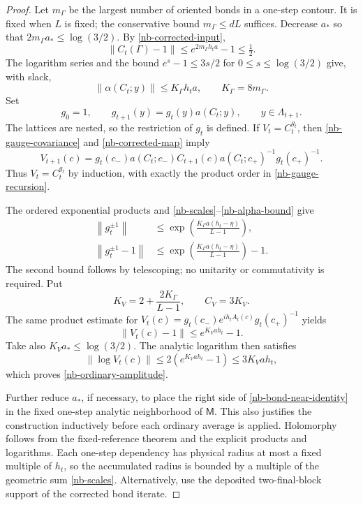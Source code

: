 \documentclass[11pt]{article}
\theoremstyle{remark}
\newcommand{\norm}[1]{\left\|#1\right\|}
\begin{document}
\begin{proof}
Let $m_\Gamma$ be the largest number of oriented bonds in a
one-step contour. It is fixed when $L$ is fixed; the conservative
bound $m_\Gamma\le dL$ suffices. Decrease $a_*$ so that
$2m_\Gamma a_*\le\log(3/2)$. By
\eqref{nb-corrected-input},
\[
 \norm{C_t(\Gamma)-1}
      \le e^{2m_\Gamma h_ta}-1\le\tfrac12.
\]
The logarithm series and the bound
$e^s-1\le3s/2$ for $0\le s\le\log(3/2)$ give, with slack,
\begin{equation}\label{nb-alpha-bound}
 \norm{\alpha(C_t;y)}\le K_\Gamma h_ta,
                   \qquad K_\Gamma=8m_\Gamma.
\end{equation}
Set
\begin{equation}\label{nb-gauge-recursion}
 g_0=1,\qquad
 g_{t+1}(y)=g_t(y)a(C_t;y),\qquad y\in\Lambda_{t+1}.
\end{equation}
The lattices are nested, so the restriction of $g_t$ is defined.
If $V_t=C_t^{g_t}$, then \eqref{nb-gauge-covariance} and
\eqref{nb-corrected-map} imply
\[
 V_{t+1}(c)=g_t(c_-)a(C_t;c_-)C_{t+1}(c)
                       a(C_t;c_+)^{-1}g_t(c_+)^{-1}.
\]
Thus $V_t=C_t^{g_t}$ by induction, with exactly the product
order in \eqref{nb-gauge-recursion}.

The ordered exponential products and
\eqref{nb-scales}--\eqref{nb-alpha-bound} give
\begin{align}
 \norm{g_t^{\pm1}}
       &\le\exp\left(\frac{K_\Gamma a(h_t-\eta)}{L-1}\right),
       \label{nb-gauge-size}\\
 \norm{g_t^{\pm1}-1}
       &\le\exp\left(\frac{K_\Gamma a(h_t-\eta)}{L-1}\right)-1.
       \label{nb-gauge-difference}
\end{align}
The second bound follows by telescoping; no unitarity or
commutativity is required. Put
\begin{equation}\label{nb-explicit-constants}
 K_V=2+\frac{2K_\Gamma}{L-1},\qquad C_V=3K_V.
\end{equation}
The same product estimate for
$V_t(c)=g_t(c_-)e^{ih_tA_t(c)}g_t(c_+)^{-1}$ yields
\begin{equation}\label{nb-bond-near-identity}
 \norm{V_t(c)-1}\le e^{K_Vah_t}-1.
\end{equation}
Take also $K_Va_*\le\log(3/2)$. The analytic logarithm then
satisfies
\[
 \norm{\log V_t(c)}
    \le2(e^{K_Vah_t}-1)\le3K_Vah_t,
\]
which proves \eqref{nb-ordinary-amplitude}.

Further reduce $a_*$, if necessary, to place the right side of
\eqref{nb-bond-near-identity} in the fixed one-step analytic
neighborhood of $\mathsf M$. This also justifies the construction
inductively before each ordinary average is applied. Holomorphy
follows from the fixed-reference theorem and the explicit
products and logarithms. Each one-step dependency has physical
radius at most a fixed multiple of $h_t$, so the accumulated
radius is bounded by a multiple of the geometric sum
\eqref{nb-scales}. Alternatively, use the deposited two-final-block
support of the corrected bond iterate.
\end{proof}
\end{document}
